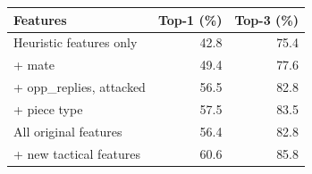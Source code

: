 \begin{tabular}{lrr}
\hline
Features & Top-1 (\%) & Top-3 (\%) \\
\hline
Heuristic features only & 42.8 & 75.4 \\
+ mate & 49.4 & 77.6 \\
+ opp\_replies, attacked & 56.5 & 82.8 \\
+ piece type & 57.5 & 83.5 \\
All original features & 56.4 & 82.8 \\
+ new tactical features & 60.6 & 85.8 \\
\hline
\end{tabular}
